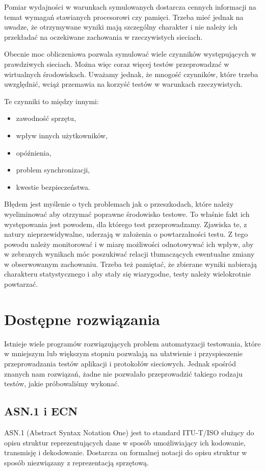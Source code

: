 \documentclass[00-praca-magisterska.tex]{subfiles}
\begin{document}
Pomiar wydajności w warunkach symulowanych dostarcza cennych informacji na
temat wymagań stawianych procesorowi czy pamięci. Trzeba mieć jednak na uwadze,
że otrzymywane wyniki mają szczególny charakter i nie należy ich przekładać na
oczekiwane zachowania w rzeczywistych sieciach. 

Obecnie moc obliczeniowa pozwala symulować wiele czynników występujących w
prawdziwych sieciach. Można więc coraz więcej testów przeprowadzać w
wirtualnych środowiskach. Uważamy jednak, że mnogość czynników, które trzeba
uwzględnić, wciąż przemawia na korzyść testów w warunkach rzeczywistych.

Te czynniki to między innymi:
\begin{itemize}
\item zawodność sprzętu,
\item wpływ innych użytkowników,
\item opóźnienia,
\item problem synchronizacji,
\item kwestie bezpieczeństwa.
\end{itemize}

Błędem jest myślenie o tych problemach jak o przeszkodach, które należy
wyeliminować aby otrzymać poprawne środowisko testowe. To właśnie fakt ich
występowania jest powodem, dla którego test przeprowadzamy. Zjawiska te, z
natury nieprzewidywalne, uderzają w założenia o powtarzalności testu. Z tego
powodu należy monitorować i w miarę możliwości odnotowywać ich wpływ, aby w
zebranych wynikach móc poszukiwać relacji tłumaczących ewentualne zmiany w
obserwowanym zachowaniu. Trzeba też pamiętać, że zbierane wyniki nabierają
charakteru statystycznego i aby stały się wiarygodne, testy należy wielokrotnie
powtarzać.

\section{Dostępne rozwiązania}

Istnieje wiele programów rozwiązujących problem automatyzacji testowania, które
w mniejszym lub większym stopniu pozwalają na ułatwienie i przyspieszenie
przeprowadzania testów aplikacji i protokołów sieciowych. Jednak spośród znanych
nam rozwiązań, żadne nie pozwalało przeprowadzić takiego rodzaju testów, jakie
próbowaliśmy wykonać.

\subsection{ASN.1 i ECN}
ASN.1 (Abstract Syntax Notation One) jest to standard ITU-T/ISO służący do opisu
struktur reprezentujących dane w sposób umożliwiający ich kodowanie, transmisję
i dekodowanie. Dostarcza on formalnej notacji do opisu struktur w sposób
niezwiązany z reprezentacją sprzętową.
\end{document}
